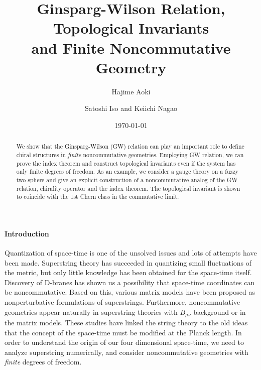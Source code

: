 \documentclass[a4paper,prl,showpacs,twocolumn]{revtex4}
\begin{document}
\title{Ginsparg-Wilson Relation, 
           Topological Invariants \\
       and Finite Noncommutative Geometry }

\author{Hajime Aoki}

\author{Satoshi Iso and Keiichi Nagao}

\date{\today}

\begin{abstract}
We show that the Ginsparg-Wilson (GW) relation can play an important role
to define chiral structures in {\it finite} noncommutative geometries.
Employing GW relation, we can prove the index theorem and construct
topological invariants even if the system has only finite degrees 
of freedom. As an example, we consider
a gauge theory on a fuzzy two-sphere and give an
explicit construction of a noncommutative analog of the
GW relation, chirality operator and the index theorem.
The topological invariant is shown to coincide with the 
1st Chern class in the commutative limit.
\end{abstract}


\maketitle


\setcounter{footnote}{0}
\paragraph{{\bf Introduction}} 
Quantization of space-time is one of
the unsolved issues  and lots of attempts have
been made. Superstring theory has succeeded in quantizing small
fluctuations of the metric,
but only little knowledge has been obtained for the space-time itself.
Discovery of D-branes has shown us a possibility that 
space-time coordinates can be noncommutative\cite{Witten}.
Based on this, various matrix models have been 
proposed as nonperturbative formulations of 
superstrings\cite{BFSS,IKKT,DVV}.
Furthermore, noncommutative geometries appear naturally 
in superstring theories with $B_{\mu \nu}$ 
background\cite{SeibergWitten} or in the matrix 
models\cite{CDS,AIIKKT}.
These studies have linked the string theory to the old
ideas that the concept of the space-time must be modified
at the Planck length\cite{Connes,tam}.
In order to understand the origin of our 
four dimensional space-time\cite{spacetime}, 
we need to analyze 
superstring numerically, and consider 
noncommutative geometries with 
{\it finite} degrees of freedom.
\end{document}
